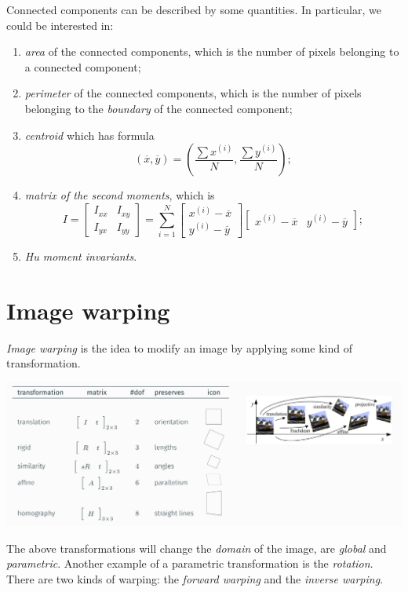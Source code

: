 \documentclass[10pt]{report}
\begin{document}
Connected components can be described by some quantities. In particular,
we could be interested in:

\begin{enumerate}
\item \emph{area} of the connected components, which is the number of pixels
belonging to a connected component;
\item \emph{perimeter} of the connected components, which is the number of
pixels belonging to the \emph{boundary} of the connected component;
\item \emph{centroid} which has formula
\[(\overline x, \overline y) = \left(\frac{\sum x^{(i)}}{N},\frac{\sum y^{(i)}}{N}\right);\]
\item \emph{matrix of the second moments}, which is
\[I = \begin{bmatrix} I_{xx} & I_{xy} \\ I_{yx} & I_{yy} \end{bmatrix} = \sum_{i=1}^N \begin{bmatrix} x^{(i)} - \overline{x} \\ y^{(i)} - \overline{y} \end{bmatrix} \begin{bmatrix} x^{(i)} - \overline{x} & y^{(i)} - \overline{y} \end{bmatrix};\]
\item \emph{Hu moment invariants}.
\end{enumerate}

\section{Image warping}
\label{image-warping}
\emph{Image warping} is the idea to modify an image by applying some kind of
transformation.

\begin{center}
\includegraphics[scale=0.27]{./pics/proc/image-warping.jpg}
\end{center}

The above transformations will change the \emph{domain} of the image, are
\emph{global} and \emph{parametric}. Another example of a parametric
transformation is the \emph{rotation}. There are two kinds of warping: the
\emph{forward warping} and the \emph{inverse warping}.
\end{document}
